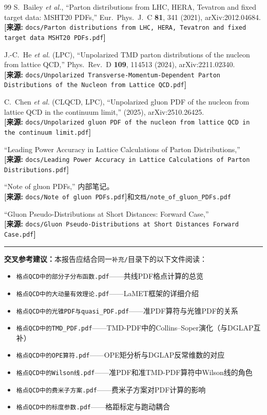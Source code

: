 \documentclass[12pt,a4paper]{ctexart}
\theoremstyle{definition}
\begin{document}
\begin{thebibliography}{99}
S.~Bailey \textit{et al.},
``Parton distributions from LHC, HERA, Tevatron and fixed target data: MSHT20 PDFs,''
Eur.\ Phys.\ J.\ C \textbf{81}, 341 (2021), arXiv:2012.04684.
\\\textbf{[来源:} \texttt{docs/Parton distributions from LHC, HERA, Tevatron and fixed target data MSHT20 PDFs.pdf}\textbf{]}

J.-C.~He \textit{et al.} (LPC),
``Unpolarized TMD parton distributions of the nucleon from lattice QCD,''
Phys.\ Rev.\ D \textbf{109}, 114513 (2024), arXiv:2211.02340.
\\\textbf{[来源:} \texttt{docs/Unpolarized Transverse-Momentum-Dependent Parton Distributions of the Nucleon from Lattice QCD.pdf}\textbf{]}

C.~Chen \textit{et al.} (CLQCD, LPC),
``Unpolarized gluon PDF of the nucleon from lattice QCD in the continuum limit,''
(2025), arXiv:2510.26425.
\\\textbf{[来源:} \texttt{docs/Unpolarized gluon PDF of the nucleon from lattice QCD in the continuum limit.pdf}\textbf{]}

``Leading Power Accuracy in Lattice Calculations of Parton Distributions,''
\\\textbf{[来源:} \texttt{docs/Leading Power Accuracy in Lattice Calculations of Parton Distributions.pdf}\textbf{]}

``Note of gluon PDFs,'' 内部笔记。
\\\textbf{[来源:} \texttt{docs/Note of gluon PDFs.pdf}\textbf{]}和\texttt{文档/note\_of\_gluon\_PDFs.pdf}

``Gluon Pseudo-Distributions at Short Distances: Forward Case,''
\\\textbf{[来源:} \texttt{docs/Gluon Pseudo-Distributions at Short Distances Forward Case.pdf}\textbf{]}

\end{thebibliography}

\vspace{0.5cm}
\noindent\rule{\textwidth}{0.5pt}
\small
\textbf{交叉参考建议：}本报告应结合同一\texttt{补充/}目录下的以下文件阅读：
\begin{itemize}[nosep]
    \item \texttt{格点QCD中的部分子分布函数.pdf}——共线PDF格点计算的总览
    \item \texttt{格点QCD中的大动量有效理论.pdf}——LaMET框架的详细介绍
    \item \texttt{格点QCD中的光锥PDF与quasi\_PDF.pdf}——准PDF算符与光锥PDF的关系
    \item \texttt{格点QCD中的TMD\_PDF.pdf}——TMD-PDF中的Collins--Soper演化（与DGLAP互补）
    \item \texttt{格点QCD中的OPE算符.pdf}——OPE矩分析与DGLAP反常维数的对应
    \item \texttt{格点QCD中的Wilson线.pdf}——准PDF和准TMD-PDF算符中Wilson线的角色
    \item \texttt{格点QCD中的费米子方案.pdf}——费米子方案对PDF计算的影响
    \item \texttt{格点QCD中的标度参数.pdf}——格距标定与跑动耦合
\end{itemize}
\end{document}
